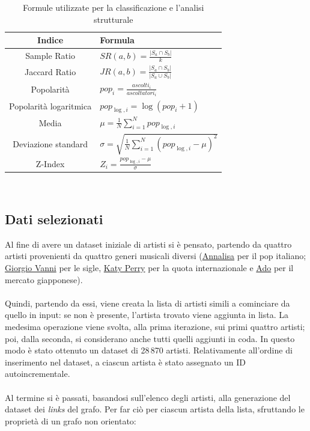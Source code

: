 \documentclass[sigchi]{acmart}
\begin{document}
\begin{table}[H]
\centering
\begin{tabular}{|c|>{\centering\arraybackslash}p{4cm}|}
\hline
\textbf{Indice} & \textbf{Formula} \\
\hline
Sample Ratio &
$SR(a, b) = \frac{|S_a \cap S_b|}{k}$ \\
\hline
Jaccard Ratio &
$JR(a, b) = \frac{|S_a \cap S_b|}{|S_a \cup S_b|}$ \\
\hline
Popolarità &
$pop_i = \frac{ascolti_i}{ascoltatori_i}$ \\
\hline
Popolarità logaritmica &
$pop_{\log,i} = \log(pop_i + 1)$ \\
\hline
Media &
$\mu = \frac{1}{N} \sum_{i=1}^{N} pop_{\log,i}$ \\
\hline
Deviazione standard &
$\sigma = \sqrt{\frac{1}{N} \sum_{i=1}^{N} (pop_{\log,i} - \mu)^2}$ \\
\hline
Z-Index &
$Z_i = \frac{pop_{\log,i} - \mu}{\sigma}$ \\
\hline
\end{tabular}\\[15pt]
\caption{Formule utilizzate per la classificazione e l'analisi strutturale}
\end{table}


\subsection{Dati selezionati}

Al fine di avere un dataset iniziale di artisti si è pensato, partendo da quattro artisti provenienti da quattro generi musicali diversi (\href{https://www.last.fm/music/Annalisa}{Annalisa} per il pop italiano; \href{https://www.last.fm/music/Giorgio+Vanni}{Giorgio Vanni} per le sigle, \href{https://www.last.fm/music/Katy+Perry}{Katy Perry} per la quota internazionale e \href{https://www.last.fm/music/Ado}{Ado} per il mercato giapponese). \\ \\ Quindi, partendo da essi, viene creata la lista di artisti simili a cominciare da quello in input: se non è presente, l'artista trovato viene aggiunta in lista. La medesima operazione viene svolta, alla prima iterazione, sui primi quattro artisti; poi, dalla seconda, si considerano anche tutti quelli aggiunti in coda. In questo modo è stato ottenuto un dataset di 28\,870 artisti. Relativamente all'ordine di inserimento nel dataset, a ciascun artista è stato assegnato un ID autoincrementale. \\ \\ Al termine si è passati, basandosi sull'elenco degli artisti, alla generazione del dataset dei {\itshape links} del grafo. Per far ciò per ciascun artista della lista, sfruttando le proprietà di un grafo non orientato:
\end{document}
